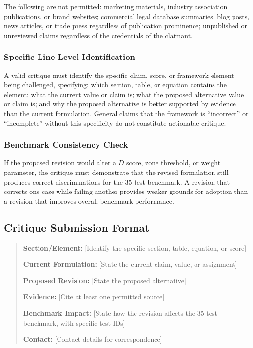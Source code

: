 \documentclass[12pt,a3paper]{article}
\begin{document}
The following are not permitted: marketing materials, industry association publications, or brand websites; commercial legal database summaries; blog posts, news articles, or trade press regardless of publication prominence; unpublished or unreviewed claims regardless of the credentials of the claimant.

\subsubsection{Specific Line-Level Identification}

A valid critique must identify the specific claim, score, or framework element being challenged, specifying: which section, table, or equation contains the element; what the current value or claim is; what the proposed alternative value or claim is; and why the proposed alternative is better supported by evidence than the current formulation. General claims that the framework is ``incorrect'' or ``incomplete'' without this specificity do not constitute actionable critique.

\subsubsection{Benchmark Consistency Check}

If the proposed revision would alter a $D$ score, zone threshold, or weight parameter, the critique must demonstrate that the revised formulation still produces correct discriminations for the 35-test benchmark. A revision that corrects one case while failing another provides weaker grounds for adoption than a revision that improves overall benchmark performance.

\subsection{Critique Submission Format}

\begin{quote}
\textbf{Section/Element:} [Identify the specific section, table, equation, or score]

\textbf{Current Formulation:} [State the current claim, value, or assignment]

\textbf{Proposed Revision:} [State the proposed alternative]

\textbf{Evidence:} [Cite at least one permitted source]

\textbf{Benchmark Impact:} [State how the revision affects the 35-test benchmark, with specific test IDs]

\textbf{Contact:} [Contact details for correspondence]
\end{quote}
\end{document}
